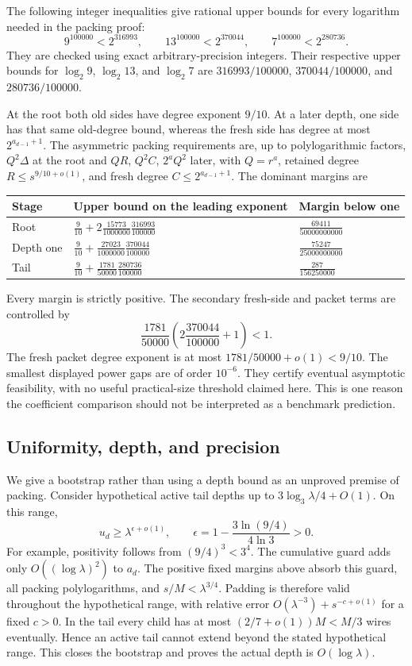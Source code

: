 The following integer inequalities give rational upper bounds for every
logarithm needed in the packing proof:
\[
 9^{100000}<2^{316993},\qquad
 13^{100000}<2^{370044},\qquad
 7^{100000}<2^{280736}.
\]
They are checked using exact arbitrary-precision integers. Their respective
upper bounds for $\log_2 9$, $\log_2 13$, and $\log_2 7$ are
$316993/100000$, $370044/100000$, and $280736/100000$.

At the root both old sides have degree exponent $9/10$. At a later depth,
one side has that same old-degree bound, whereas the fresh side has degree
at most $2^{a_{d-1}+1}$. The asymmetric packing requirements are, up to
polylogarithmic factors, $Q^2\Delta$ at the root and $QR$, $Q^2C$,
$2^aQ^2$ later, with $Q=r^a$, retained degree $R\le s^{9/10+o(1)}$,
and fresh degree $C\le2^{a_{d-1}+1}$. The dominant margins are
\begin{center}
\begin{tabular}{lll}
\hline
Stage & Upper bound on the leading exponent & Margin below one\\
\hline
Root & $\displaystyle \frac9{10}
       +2\frac{15773}{1000000}\frac{316993}{100000}$
     & $\displaystyle\frac{69411}{50000000000}$\\[5pt]
Depth one & $\displaystyle \frac9{10}
       +\frac{27023}{1000000}\frac{370044}{100000}$
     & $\displaystyle\frac{75247}{25000000000}$\\[5pt]
Tail & $\displaystyle \frac9{10}
       +\frac{1781}{50000}\frac{280736}{100000}$
     & $\displaystyle\frac{287}{156250000}$\\
\hline
\end{tabular}
\end{center}
Every margin is strictly positive. The secondary fresh-side and packet
terms are controlled by
\[
 \frac{1781}{50000}
       \left(2\frac{370044}{100000}+1\right)<1.
\]
The fresh packet degree exponent is at most $1781/50000+o(1)<9/10$.
The smallest displayed power gaps are of order $10^{-6}$. They certify
eventual asymptotic feasibility, with no useful practical-size threshold
claimed here. This is one reason the coefficient comparison should not
be interpreted as a benchmark prediction.

\subsection{Uniformity, depth, and precision}

We give a bootstrap rather than using a depth bound as an unproved premise
of packing. Consider hypothetical active tail depths up to
$3\log_3\lambda/4+O(1)$. On this range,
\[
 u_d\ge\lambda^{\epsilon+o(1)},\qquad
 \epsilon=1-\frac{3\ln(9/4)}{4\ln3}>0.
\]
For example, positivity follows from $(9/4)^3<3^4$.
The cumulative guard adds only $O((\log\lambda)^2)$ to $a_d$.
The positive fixed margins above absorb this guard, all packing
polylogarithms, and $s/M<\lambda^{3/4}$. Padding is therefore valid
throughout the hypothetical range, with relative error
$O(\lambda^{-3})+s^{-c+o(1)}$ for a fixed $c>0$. In the tail every
child has at most $(2/7+o(1))M<M/3$ wires eventually. Hence an active
tail cannot extend beyond the stated hypothetical range. This closes the
bootstrap and proves the actual depth is $O(\log\lambda)$.

